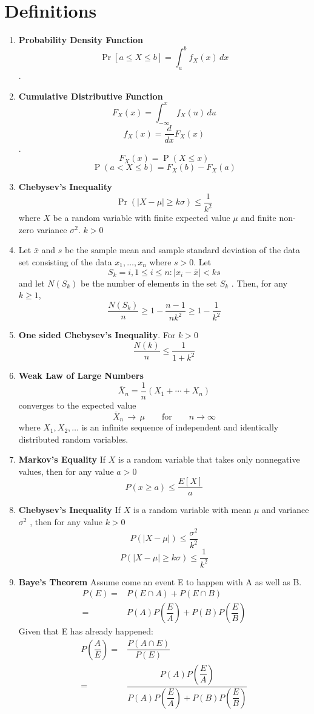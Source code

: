 \documentclass[a4paper,oneside]{book}
\begin{document}
\section{Definitions}
\begin{enumerate}
\item \textbf{Probability Density Function}
$$ \Pr [a \le X \le b] = \int_a^b f_X(x) \, dx $$.
\item \textbf{Cumulative Distributive Function}
$$ F_X(x) = \int_{-\infty}^x f_X(u) \, du $$
$$ f_X(x) = \frac{d}{dx} F_X(x) $$.
$$F_X(x) = \operatorname{P}(X\leq x)$$
$$ \operatorname{P}(a < X \le b)= F_X(b)-F_X(a)$$
\item \textbf{Chebysev's Inequality}
$$ \Pr(|X-\mu|\geq k\sigma) \leq \frac{1}{k^2} $$
 where $X$ be a random variable with finite expected value $\mu$ and finite non-zero variance $\sigma^2$. $k > 0$\\
\item Let $\bar{x}$ and $s$ be the sample mean and sample standard deviation of the data set consisting
 of the data $x_1, \ldots , x_n$ where $s > 0$. Let
 $$ S_k = {i, 1 \le i \le n : |x_i - \bar{x} | < ks} $$
 and let $N (S_k)$ be the number of elements in the set $S_k$ . Then, for any $k \ge 1$,
 $$ \dfrac{N(S_k)}{n} \ge 1 - \dfrac{n-1}{nk^2} \ge 1 - \dfrac{1}{k^2}$$
\item \textbf{One sided Chebysev's Inequality}. For $k > 0$
$$ \dfrac{N(k)}{n} \le \dfrac{1}{1 + k^2}$$
\item \textbf{Weak Law of Large Numbers}
$$ \overline{X}_n=\dfrac{1}{n}(X_1+\cdots+X_n)  $$ converges to the expected value
$$ \overline{X}_n \, \to \, \mu \qquad\textrm{for}\qquad n \to \infty$$ where $X_1, X_2, \ldots$ is an infinite sequence of independent and identically distributed random variables.
\item \textbf{Markov's Equality}
If $X$ is a random variable that takes only nonnegative values, then for any value $a > 0$
$$ P(x \ge a) \le \dfrac{E[X]}{a}$$
\item \textbf{Chebysev's Inequality}
If $X$ is a random variable with mean $\mu$ and variance $\sigma^2$ , then for any value $k > 0$
$$ P(\left|X-\mu\right|) \le \dfrac{\sigma^2}{k^2}$$
$$ P(|X - \mu| \ge k\sigma)  \le	\dfrac{1}{k^2}$$
\item \textbf{Baye's Theorem} Assume come an event E to happen with A as well as B.
\begin{eqnarray}
 P(E) = & P(E \cap A) + P(E \cap B) \\
      = & P(A)P\left(\dfrac{E}{A}\right) + P(B)P\left(\dfrac{E}{B}\right) 
\end{eqnarray}
Given that E has already happened:
\begin{eqnarray}
P\left(\dfrac{A}{E}\right) = & \dfrac{P(A \cap E)}{P(E)} \\
= & \dfrac{P(A)P\left(\dfrac{E}{A}\right)}{P(A)P\left(\dfrac{E}{A}\right) + P(B)P\left(\dfrac{E}{B}\right)}
\end{eqnarray}
\end{enumerate}
\end{document}
